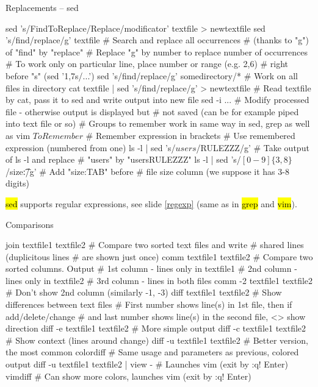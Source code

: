 \documentclass[compress, ucs, xelatex, 11pt, xcolor=svgnames,
  hyperref={
    bookmarks=true,
    unicode=true,
    colorlinks=true,
    pdftitle={Linux, command line and MetaCentrum},
    plainpages=false,
    pdfauthor={Vojtech Zeisek},
    pdfsubject={Course about use of Linux command line, writing shell scripts and using MetaCentrum of CESNET},
    pdfcreator={XeLaTeX},
    pdfkeywords={Linux, GNU, BASH, shell, command line, MetaCentrum},
    linkcolor=Red,
    anchorcolor=Blue,
    citecolor=Purple,
    filecolor=DodgerBlue,
    menucolor=DarkOrchid,
    urlcolor=DeepSkyBlue,
    pdftex},
  url={hyphens, lowtilde} %
  ]{beamer}
\renewcommand{\texttt}[1]{\hl{\ttfamily #1}}
\begin{document}
\begin{frame}[fragile]{Replacements -- sed}
  \begin{bashcode}
    sed 's/FindToReplace/Replace/modificator' textfile > newtextfile
    sed 's/find/replace/g' textfile # Search and replace all occurrences
                                    # (thanks to "g") of "find" by "replace"
    # Replace "g" by number to replace number of occurrences
    # To work only on particular line, place number or range (e.g. 2,6)
    # right before "s" (sed '1,7s/...')
    sed 's/find/replace/g' somedirectory/* # Work on all files in directory
    cat textfile | sed 's/find/replace/g' > newtextfile
      # Read textfile by cat, pass it to sed and write output into new file
    sed -i ... # Modify processed file - otherwise output is displayed but
               # not saved (can be for example piped into text file or so)
    # Groups to remember work in same way in sed, grep as well as vim
    \(ToRemember\) # Remember expression in brackets
    \Number # Use remembered expression (numbered from one)
    ls -l | sed 's/\(users\)/\1RULEZZZ/g' # Take output of ls -l and replace
                                          # "users" by "usersRULEZZZ"
    ls -l | sed 's/\([0-9]\{3,8\}\)/size:\t\1/g' # Add "size:TAB" before
                       # file size column (we suppose it has 3-8 digits)
  \end{bashcode}
\texttt{sed} supports regular expressions, see slide \ref{regexp} (same as in \texttt{grep} and \texttt{vim}).
\end{frame}

\begin{frame}[fragile]{Comparisons}
  \begin{bashcode}
    join textfile1 textfile2 # Compare two sorted text files and write
                             # shared lines (duplicitous lines 
                             # are shown just once)
    comm textfile1 textfile2 # Compare two sorted columns. Output
      # 1st column - lines only in textfile1
      # 2nd column - lines only in textfile2
      # 3rd column - lines in both files
    comm -2 textfile1 textfile2 # Don't show 2nd column (similarly -1, -3)
    diff textfile1 textfile2 # Show differences between text files
      # First number shows line(s) in 1st file, then if add/delete/change
      # and last number shows line(s) in the second file, <> show direction
    diff -e textfile1 textfile2 # More simple output
    diff -c textfile1 textfile2 # Show context (lines around change)
    diff -u textfile1 textfile2 # Better version, the most common
    colordiff # Same usage and parameters as previous, colored output
    diff -u textfile1 textfile2 | view - # Launches vim (exit by :q! Enter)
    vimdiff # Can show more colors, launches vim (exit by :q! Enter)
  \end{bashcode}
\end{frame}
\end{document}
